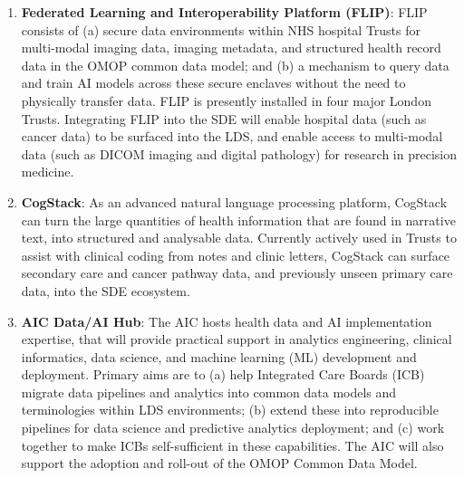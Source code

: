 \documentclass[
  letterpaper,
  DIV=11,
  numbers=noendperiod]{scrartcl}
\begin{document}
\begin{enumerate}
\def\labelenumi{(\arabic{enumi})}
\item
  \textbf{Federated Learning and Interoperability Platform (FLIP)}: FLIP
  consists of (a) secure data environments within NHS hospital Trusts
  for multi-modal imaging data, imaging metadata, and structured health
  record data in the OMOP common data model; and (b) a mechanism to
  query data and train AI models across these secure enclaves without
  the need to physically transfer data. FLIP is presently installed in
  four major London Trusts. Integrating FLIP into the SDE will enable
  hospital data (such as cancer data) to be surfaced into the LDS, and
  enable access to multi-modal data (such as DICOM imaging and digital
  pathology) for research in precision medicine.
\item
  \textbf{CogStack}: As an advanced natural language processing
  platform, CogStack can turn the large quantities of health information
  that are found in narrative text, into structured and analysable data.
  Currently actively used in Trusts to assist with clinical coding from
  notes and clinic letters, CogStack can surface secondary care and
  cancer pathway data, and previously unseen primary care data, into the
  SDE ecosystem.
\item
  \textbf{AIC Data/AI Hub}: The AIC hosts health data and AI
  implementation expertise, that will provide practical support in
  analytics engineering, clinical informatics, data science, and machine
  learning (ML) development and deployment. Primary aims are to (a) help
  Integrated Care Boards (ICB) migrate data pipelines and analytics into
  common data models and terminologies within LDS environments; (b)
  extend these into reproducible pipelines for data science and
  predictive analytics deployment; and (c) work together to make ICBs
  self-sufficient in these capabilities. The AIC will also support the
  adoption and roll-out of the OMOP Common Data Model.
\end{enumerate}
\end{document}
